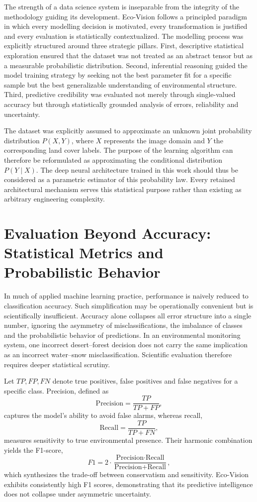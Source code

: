 \documentclass[12pt,a4paper]{report}
\begin{document}
The strength of a data science system is inseparable from the integrity of the methodology guiding its development. Eco-Vision follows a principled paradigm in which every modelling decision is motivated, every transformation is justified and every evaluation is statistically contextualized. The modelling process was explicitly structured around three strategic pillars. First, descriptive statistical exploration ensured that the dataset was not treated as an abstract tensor but as a measurable probabilistic distribution. Second, inferential reasoning guided the model training strategy by seeking not the best parameter fit for a specific sample but the best generalizable understanding of environmental structure. Third, predictive credibility was evaluated not merely through single-valued accuracy but through statistically grounded analysis of errors, reliability and uncertainty.

The dataset was explicitly assumed to approximate an unknown joint probability distribution \( P(X, Y) \), where \(X\) represents the image domain and \(Y\) the corresponding land cover labels. The purpose of the learning algorithm can therefore be reformulated as approximating the conditional distribution \( P(Y \mid X) \). The deep neural architecture trained in this work should thus be considered as a parametric estimator of this probability law. Every retained architectural mechanism serves this statistical purpose rather than existing as arbitrary engineering complexity.

\section{Evaluation Beyond Accuracy: Statistical Metrics and Probabilistic Behavior}

In much of applied machine learning practice, performance is naively reduced to classification accuracy. Such simplification may be operationally convenient but is scientifically insufficient. Accuracy alone collapses all error structure into a single number, ignoring the asymmetry of misclassifications, the imbalance of classes and the probabilistic behavior of predictions. In an environmental monitoring system, one incorrect desert–forest decision does not carry the same implication as an incorrect water–snow misclassification. Scientific evaluation therefore requires deeper statistical scrutiny.

Let \( TP, FP, FN \) denote true positives, false positives and false negatives for a specific class. Precision, defined as
\[
\text{Precision} = \frac{TP}{TP + FP},
\]
captures the model’s ability to avoid false alarms, whereas recall,
\[
\text{Recall} = \frac{TP}{TP + FN},
\]
measures sensitivity to true environmental presence. Their harmonic combination yields the F1-score,
\[
F1 = 2 \cdot \frac{\text{Precision} \cdot \text{Recall}}{\text{Precision} + \text{Recall}},
\]
which synthesizes the trade-off between conservatism and sensitivity. Eco-Vision exhibits consistently high F1 scores, demonstrating that its predictive intelligence does not collapse under asymmetric uncertainty.
\end{document}
